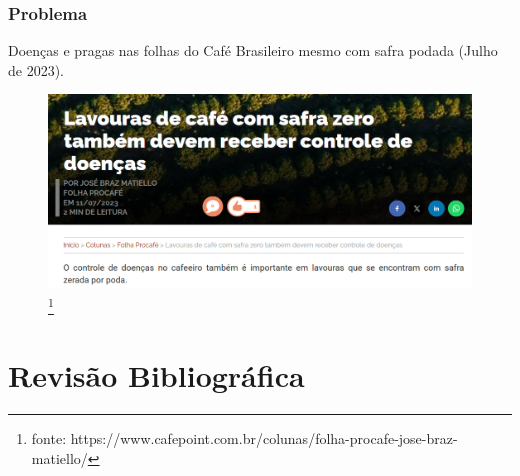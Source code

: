 \documentclass[aspectratio=169]{beamer}
\begin{document}
\begin{frame}
    \frametitle{Problema}

    \centering
    Doenças e pragas nas folhas do Café Brasileiro mesmo com safra podada (Julho de 2023).


    \begin{figure}
        \centering
        \includegraphics[scale=0.55]{img/safrazero.png}
        \footnote{ \tiny fonte: https://www.cafepoint.com.br/colunas/folha-procafe-jose-braz-matiello/}
        \label{fig:enter-label}
    \end{figure}


\end{frame}




\section{Revisão Bibliográfica} %
\end{document}
